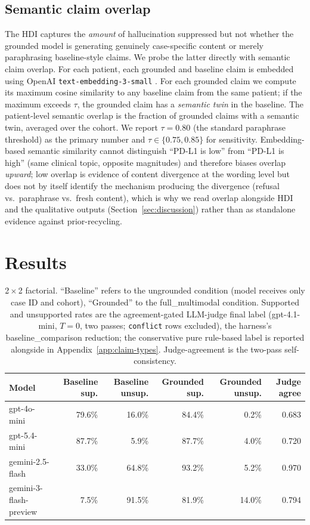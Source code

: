 \documentclass{article}
\theoremstyle{plain}
\begin{document}
\subsection{Semantic claim overlap}
The HDI captures the \emph{amount} of hallucination suppressed but not whether the grounded model is generating genuinely case-specific content or merely paraphrasing baseline-style claims. We probe the latter directly with semantic claim overlap. For each patient, each grounded and baseline claim is embedded using OpenAI \texttt{text-embedding-3-small} \citep{openai2024embeddings}. For each grounded claim we compute its maximum cosine similarity to any baseline claim from the same patient; if the maximum exceeds $\tau$, the grounded claim has a \emph{semantic twin} in the baseline. The patient-level semantic overlap is the fraction of grounded claims with a semantic twin, averaged over the cohort. We report $\tau = 0.80$ (the standard paraphrase threshold) as the primary number and $\tau \in \{0.75, 0.85\}$ for sensitivity. Embedding-based semantic similarity cannot distinguish ``PD-L1 is low'' from ``PD-L1 is high'' (same clinical topic, opposite magnitudes) and therefore biases overlap \emph{upward}; low overlap is evidence of content divergence at the wording level but does not by itself identify the mechanism producing the divergence (refusal vs.\ paraphrase vs.\ fresh content), which is why we read overlap alongside HDI and the qualitative outputs (Section~\ref{sec:discussion}) rather than as standalone evidence against prior-recycling.

\section{Results}
\label{sec:results}

\begin{table}[!t]
\centering
\small
\begin{tabular}{lrrrrr}
\toprule
\textbf{Model} & \textbf{Baseline sup.} & \textbf{Baseline unsup.} & \textbf{Grounded sup.} & \textbf{Grounded unsup.} & \textbf{Judge agree} \\
\midrule
gpt-4o-mini             & 79.6\% & 16.0\% & 84.4\% & 0.2\%  & 0.683 \\
gpt-5.4-mini            & 87.7\% & 5.9\%  & 87.7\% & 4.0\%  & 0.720 \\
gemini-2.5-flash        & 33.0\% & 64.8\% & 93.2\% & 5.2\%  & 0.970 \\
gemini-3-flash-preview  & 7.5\%  & 91.5\% & 81.9\% & 14.0\% & 0.794 \\
\bottomrule
\end{tabular}
\caption{2\,$\times$\,2 factorial. ``Baseline'' refers to the ungrounded condition (model receives only case ID and cohort), ``Grounded'' to the full\_multimodal condition. Supported and unsupported rates are the agreement-gated LLM-judge final label (gpt-4.1-mini, $T{=}0$, two passes; \texttt{conflict} rows excluded), the harness's \textsf{baseline\_comparison} reduction; the conservative pure rule-based label is reported alongside in Appendix~\ref{app:claim-types}. Judge-agreement is the two-pass self-consistency.}
\label{tab:factorial}
\end{table}
\end{document}
